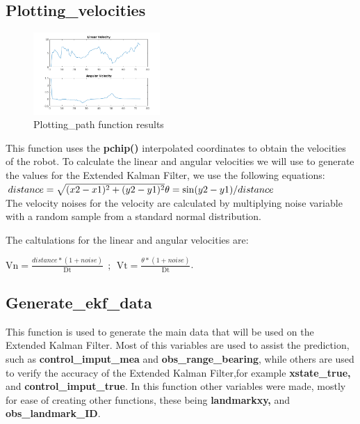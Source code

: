 \documentclass[runningheads]{llncs}
\begin{document}
\break


\subsection*{Plotting\_velocities}

\begin{figure}
    \centering
    \includegraphics[width=0.43\textwidth]{plotting_velocities.png}
    \caption{Plotting\_path function results}
    \label{plotting_vel_fig}
\end{figure}

This function uses the \textbf{pchip()} interpolated coordinates to obtain the velocities of the robot. 
To calculate the linear and angular velocities we will use to generate the values for the Extended Kalman Filter, we use the following equations:
\\
\begin{math}
    distance=\sqrt{(x2-x1)^2+(y2-y1)^2} \\  \theta=\sin(y2-y1)/distance
\end{math}
\\
The velocity noises for the velocity are calculated by multiplying noise variable with a random sample from a standard normal distribution.

The caltulations for the linear and angular velocities are:
\begin{center}    
    \begin{math}
        \mathrm{Vn}=\frac{distance*(1+noise)}{\mathrm{Dt}} \ \ ; \ \ \mathrm{Vt}=\frac{\theta*(1+noise)}{\mathrm{Dt}}
    \end{math}.
\end{center}




\subsection*{Generate\_ekf\_data}
This function is used to generate the main data that will be used on the Extended Kalman Filter. 
Most of this variables are used to assist the prediction, such as \textbf{control\_imput\_mea} and \textbf{obs\_range\_bearing}, 
while others are used to verify the accuracy of the Extended Kalman Filter,for example  \textbf{xstate\_true,} and \textbf{control\_imput\_true}.  
In this function other variables were made, mostly for ease of creating other functions, these being \textbf{landmarkxy,} and \textbf{obs\_landmark\_ID}.
\end{document}

